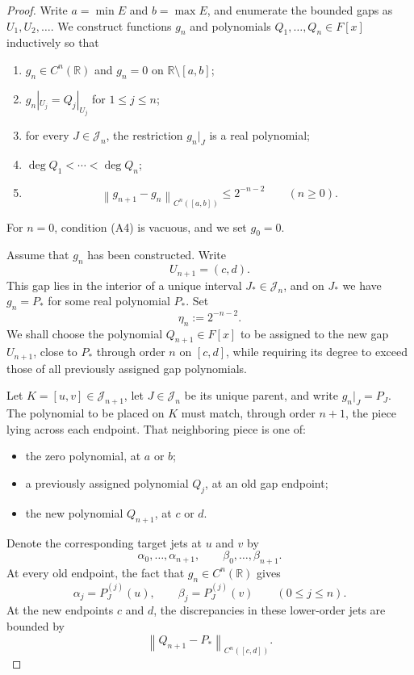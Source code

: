 \documentclass[10pt,a4paper]{amsart}
\newcommand{\R}{\mathbb R}
\newcommand{\norm}[1]{\left\lVert #1\right\rVert}
\begin{document}
\begin{proof}
Write $a=\min E$ and $b=\max E$, and enumerate the bounded gaps as
$U_1,U_2,\dots$. We construct functions $g_n$ and polynomials
$Q_1,\dots,Q_n\in F[x]$ inductively so that
\begin{enumerate}[label=\textup{(A\arabic*)},leftmargin=3.1em]
\item $g_n\in C^n(\R)$ and $g_n=0$ on $\R\setminus[a,b]$;
\item $g_n|_{U_j}=Q_j|_{U_j}$ for $1\leq j\leq n$;
\item for every $J\in\mathcal J_n$, the restriction $g_n|_J$ is a real polynomial;
\item $\deg Q_1<\cdots<\deg Q_n$;
\item
\begin{equation}\label{eq:increment}
\norm{g_{n+1}-g_n}_{C^n([a,b])}\leq2^{-n-2}
\qquad(n\geq0).
\end{equation}
\end{enumerate}
For $n=0$, condition \textup{(A4)} is vacuous, and we set $g_0=0$.

Assume that $g_n$ has been constructed. Write
\[
U_{n+1}=(c,d).
\]
This gap lies in the interior of a unique interval
$J_*\in\mathcal J_n$, and on $J_*$ we have $g_n=P_*$ for some real
polynomial $P_*$. Set
\[
\eta_n:=2^{-n-2}.
\]
We shall choose the polynomial $Q_{n+1}\in F[x]$ to be assigned to the new gap
$U_{n+1}$, close to $P_*$ through order $n$ on $[c,d]$, while requiring its
degree to exceed those of all previously assigned gap polynomials.

Let $K=[u,v]\in\mathcal J_{n+1}$, let $J\in\mathcal J_n$ be its unique
parent, and write $g_n|_J=P_J$. The polynomial to be placed on $K$ must
match, through order $n+1$, the piece lying across each endpoint. That
neighboring piece is one of:
\begin{itemize}
\item the zero polynomial, at $a$ or $b$;
\item a previously assigned polynomial $Q_j$, at an old gap endpoint;
\item the new polynomial $Q_{n+1}$, at $c$ or $d$.
\end{itemize}
Denote the corresponding target jets at $u$ and $v$ by
\[
\alpha_0,\dots,\alpha_{n+1},
\qquad
\beta_0,\dots,\beta_{n+1}.
\]
At every old endpoint, the fact that $g_n\in C^n(\R)$ gives
\[
\alpha_j=P_J^{(j)}(u),
\qquad
\beta_j=P_J^{(j)}(v)
\qquad(0\leq j\leq n).
\]
At the new endpoints $c$ and $d$, the discrepancies in these lower-order
jets are bounded by
\[
\norm{Q_{n+1}-P_*}_{C^n([c,d])}.
\]


\end{proof}
\end{document}
